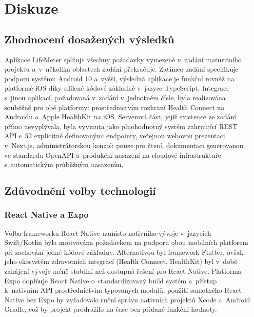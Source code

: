 \chapter*{Diskuze}

\section{Zhodnocení dosažených výsledků}

Aplikace LifeMeter splňuje všechny požadavky vymezené v~zadání maturitního
projektu a~v~několika oblastech zadání překračuje. Zatímco zadání specifikuje
podporu systému Android 10 a~vyšší, výsledná aplikace je funkční rovněž na
platformě iOS díky sdílené kódové základně v~jazyce TypeScript. Integrace
s~jinou aplikací, požadovaná v~zadání v~jednotném čísle, byla realizována
souběžně pro obě platformy: prostřednictvím rozhraní Health Connect na
Androidu a~Apple HealthKit na iOS. Serverová část, jejíž existence ze zadání
přímo nevyplývala, byla vyvinuta jako plnohodnotný systém zahrnující REST API
s~52 explicitně definovanými endpointy, veřejnou webovou prezentaci v~Next.js,
administrátorskou konzoli pouze pro čtení, dokumentaci generovanou ve standardu
OpenAPI a~produkční nasazení na cloudové infrastruktuře s~automatickým
průběžným nasazením.

\section{Zdůvodnění volby technologií}

\subsection{React Native a Expo}

Volba frameworku React Native namísto nativního vývoje v~jazycích
Swift/Kotlin byla motivována požadavkem na podporu obou mobilních platforem
při zachování jedné kódové základny. Alternativou byl framework Flutter,
avšak jeho ekosystém zdravotních integrací (Health Connect, HealthKit)
byl v~době zahájení vývoje méně stabilní než dostupná řešení pro React Native.
Platforma Expo doplňuje React Native o~standardizovaný build systém
a~přístup k~nativním API prostřednictvím typovaných modulů; použití samotného
React Native bez Expo by vyžadovalo ruční správu nativních projektů Xcode
a~Android Gradle, což by projekt prodražilo na čase bez přidané funkční hodnoty.

